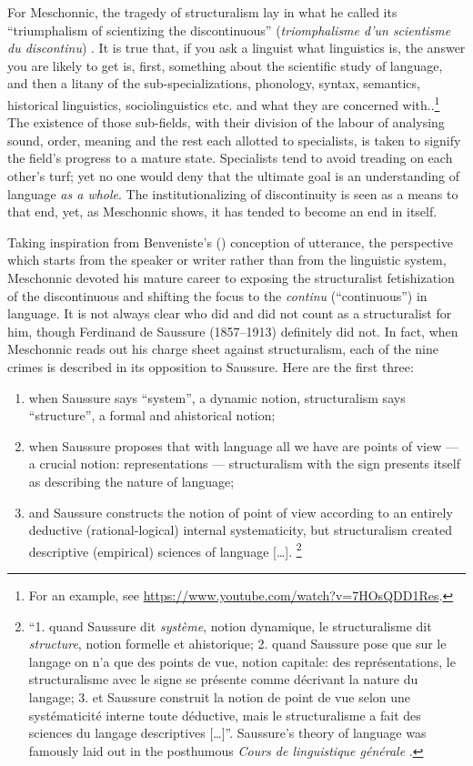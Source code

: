 \documentclass[output=paper]{langscibook}
\begin{document}
For Meschonnic, the tragedy of structuralism lay in what he called its ``triumphalism of scientizing the discontinuous'' (\emph{triomphalisme d’un scientisme du discontinu}) \citep[20]{Meschonnic2009}. It is true that, if you ask a linguist what linguistics is, the answer you are likely to get is, first, something about the scientific study of language, and then a litany of the sub-specializations, phonology, syntax, semantics, historical linguistics, sociolinguistics etc. and what they are concerned with..\footnote{For an example, see \url{https://www.youtube.com/watch?v=7HOsQDD1Res}.} The existence of those sub-fields, with their division of the labour of analysing sound, order, meaning and the rest each allotted to specialists, is taken to signify the field's progress to a mature state. Specialists tend to avoid treading on each other's turf; yet no one would deny that the ultimate goal is an understanding of language \emph{as a whole}. The institutionalizing of discontinuity is seen as a means to that end, yet, as Meschonnic shows, it has tended to become an end in itself.

Taking inspiration from Benveniste's (\citeyear{Benveniste1970appareil}) conception of utterance, the perspective which starts from the speaker or writer rather than from the linguistic system, Meschonnic devoted his mature career to exposing the structuralist fetishization of the discontinuous and shifting the focus to the \emph{continu} (``continuous'') in language. It is not always clear who did and did not count as a structuralist for him, though Ferdinand de Saussure (1857--1913) definitely did not. In fact, when Meschonnic reads out his charge sheet against structuralism, each of the nine crimes is described in its opposition to Saussure. Here are the first three:

\begin{enumerate}
    \item when Saussure says ``system'', a dynamic notion, structuralism says ``structure'', a formal and ahistorical notion;
    \item when Saussure proposes that with language all we have are points of view — a crucial notion: representations — structuralism with the sign presents itself as describing the nature of language;
    \item and Saussure constructs the notion of point of view according to an entirely deductive (rational-logical) internal systematicity, but structuralism created descriptive (empirical) sciences of language […]. \linebreak\citep[20]{Meschonnic2009}\footnote{``1. quand Saussure dit \emph{système}, notion dynamique, le structuralisme dit \emph{structure}, notion formelle et ahistorique; 2. quand Saussure pose que sur le langage on n'a que des points de vue, notion capitale: des représentations, le structuralisme avec le signe se présente comme décrivant la nature du langage; 3. et Saussure construit la notion de point de vue selon une systématicité interne toute déductive, mais le structuralisme a fait des sciences du langage descriptives […]''. Saussure's theory of language was famously laid out in the posthumous \emph{Cours de linguistique générale} \citep{Saussure19221916}.}
\end{enumerate}
\end{document}
